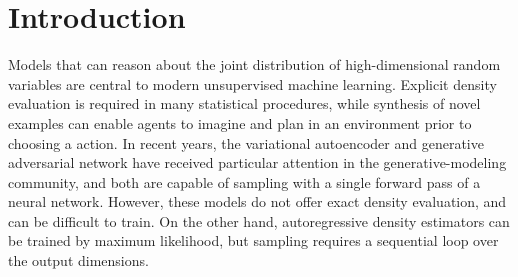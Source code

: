 \section{Introduction}

Models that can reason about the joint distribution of high-dimensional random variables are central to modern unsupervised machine learning. 
Explicit density evaluation is required in many statistical procedures,
while synthesis of novel examples can enable agents to imagine and plan in an environment prior to choosing a action.
In recent years, the variational autoencoder \citep[VAE,][]{Kingma:2014:vae, Rezende:2014:vae} and generative adversarial network \citep[GAN,][]{goodfellow:2014:gan} have received particular attention in the generative-modeling community, and both are capable of sampling with a single forward pass of a neural network. 
However, these models do not offer exact density evaluation, and can be difficult to train.
On the other hand, autoregressive density estimators \citep{uria2013rnade, germain2015made, oord2016pixelrnn, van2016pixelcnn, salimans2017pixelcnn++, van2016wavenet} can be trained by maximum likelihood,
but sampling requires a sequential loop over the output dimensions.

